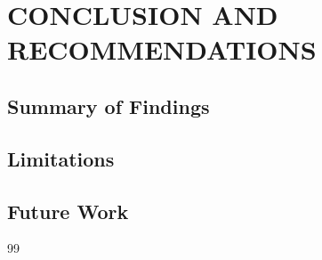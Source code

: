 \chapter{CONCLUSION AND RECOMMENDATIONS}

\section{Summary of Findings}

\section{Limitations}

\section{Future Work}


\begin{thebibliography}{99}





\end{thebibliography}

